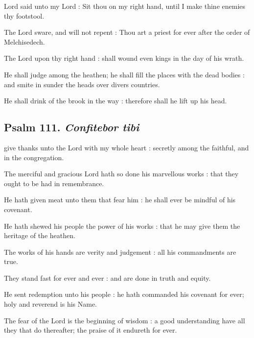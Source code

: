  Lord said unto my Lord : Sit thou on my right hand, until I make thine enemies thy footstool.\par
{}
The Lord sware, and will not repent : Thou art a priest for ever after the order of Melchisedech.\par
{}The Lord upon thy right hand : shall wound even kings in the day of his wrath.\par
{}He shall judge among the heathen; he shall fill the places with the dead bodies : and smite in sunder the heads over divers countries.\par
{}He shall drink of the brook in the way : therefore shall he lift up his head.\par

\subsection{Psalm 111. \textit{Confitebor tibi}}

 give thanks unto the Lord with my whole heart : secretly among the faithful, and in the congregation.\par
{}
The merciful and gracious Lord hath so done his marvellous works : that they ought to be had in remembrance.\par
{}He hath given meat unto them that fear him : he shall ever be mindful of his covenant.\par
{}He hath shewed his people the power of his works : that he may give them the heritage of the heathen.\par
{}The works of his hands are verity and judgement : all his commandments are true.\par
{}They stand fast for ever and ever : and are done in truth and equity.\par
{}He sent redemption unto his people : he hath commanded his covenant for ever; holy and reverend is his Name.\par
{}The fear of the Lord is the beginning of wisdom : a good understanding have all they that do thereafter; the praise of it endureth for ever.\par

